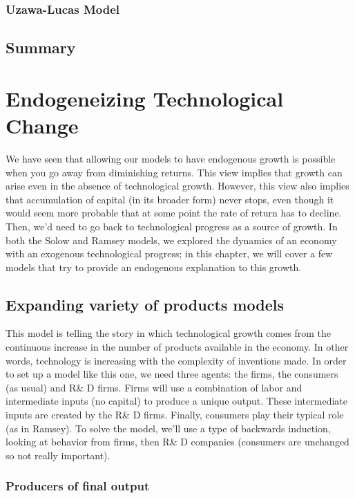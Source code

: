 \documentclass[12pt]{report}
\begin{document}
\subsection{Uzawa-Lucas Model}



\section{Summary}



\chapter{Endogeneizing Technological Change}

We have seen that allowing our models to have endogenous growth is possible when you go away from diminishing returns. This view implies that growth can arise even in the absence of  technological growth. However, this view also implies that accumulation of capital (in its broader form) never stops, even though it would seem more probable that at some point the rate of return has to decline. Then, we'd need to go back to technological progress as a source of growth. In both the Solow and Ramsey models, we explored the dynamics of an economy with an exogenous technological progress; in this chapter, we will cover a few models that try to provide an endogenous explanation to this growth.

\section{Expanding variety of products models}

This model is telling the story in which technological growth comes from the continuous increase in the number of products available in the economy. In other words, technology is increasing with the complexity of inventions made. In order to set up a model like this one, we need three agents: the firms, the consumers (as usual) and R\& D firms. Firms will use a combination of labor and intermediate inputs (no capital) to produce a unique output. These intermediate inputs are created by the R\& D firms. Finally, consumers play their typical role (as in Ramsey). To solve the model, we'll use a type of backwards induction, looking at behavior from firms, then R\& D companies (consumers are unchanged so not really important).

\subsection{Producers of final output}
\end{document}
